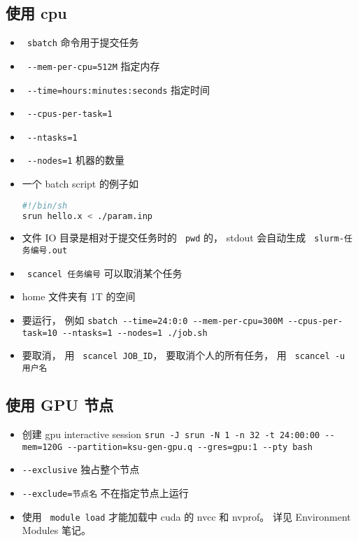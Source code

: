 
\begin{issues}
\issueDraft
\end{issues}

\subsection{使用 cpu}
\begin{itemize}
\item \verb` sbatch` 命令用于提交任务
\item \verb` --mem-per-cpu=512M` 指定内存
\item \verb` --time=hours:minutes:seconds` 指定时间
\item \verb` --cpus-per-task=1`
\item \verb` --ntasks=1`
\item \verb` --nodes=1` 机器的数量
\item 一个 batch script 的例子如
\begin{lstlisting}[language=bash]
#!/bin/sh
srun hello.x < ./param.inp
\end{lstlisting}
\item 文件 IO 目录是相对于提交任务时的 \verb` pwd` 的， stdout 会自动生成 \verb` slurm-任务编号.out`
\item \verb` scancel 任务编号` 可以取消某个任务
\item home 文件夹有 1T 的空间
\item 要运行， 例如
\verb|sbatch --time=24:0:0 --mem-per-cpu=300M --cpus-per-task=10 --ntasks=1 --nodes=1 ./job.sh|
\item 要取消， 用 \verb` scancel JOB_ID`， 要取消个人的所有任务， 用 \verb` scancel -u 用户名`
\end{itemize}

\subsection{使用 GPU 节点}
\begin{itemize}
\item 创建 gpu interactive session \verb|srun -J srun -N 1 -n 32 -t 24:00:00 --mem=120G --partition=ksu-gen-gpu.q --gres=gpu:1 --pty bash|
\item \verb`--exclusive` 独占整个节点
\item \verb`--exclude=节点名` 不在指定节点上运行
\item 使用 \verb` module load` 才能加载中 cuda 的 nvcc 和 nvprof。 详见 Environment Modules 笔记。
\end{itemize}

